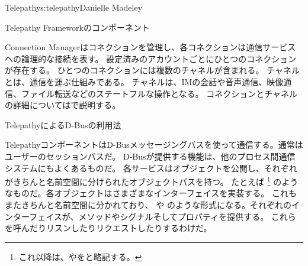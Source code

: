 \begin{aosachapter}{Telepathy}{s:telepathy}{Danielle Madeley}
\begin{aosasect1}{Telepathy Frameworkのコンポーネント}
\begin{aosadescription}
\end{aosadescription}

Connection Managerはコネクションを管理し、各コネクションは通信サービスへの論理的な接続を表す。
設定済みのアカウントごとにひとつのコネクションが存在する。
ひとつのコネクションには複数のチャネルが含まれる。
チャネルとは、通信を運ぶ仕組みである。
チャネルは、IMの会話や音声通信、映像通信、ファイル転送などのステートフルな操作となる。
コネクションとチャネルの詳細についてはで説明する。

\end{aosasect1}

\begin{aosasect1}{TelepathyによるD-Busの利用法}

TelepathyコンポーネントはD-Busメッセージングバスを使って通信する。通常はユーザーのセッションバスだ。
D-Busが提供する機能は、他のプロセス間通信システムにもよくあるものだ。
各サービスはオブジェクトを公開し、それぞれがきちんと名前空間に分けられたオブジェクトパスを持つ。
たとえば
\footnote{これ以降は、やをと略記する。}
のようなものだ。各オブジェクトはさまざまなインターフェイスを実装する。
これもまたきちんと名前空間に分かれており、
や
のような形式になる。それぞれのインターフェイスが、メソッドやシグナルそしてプロパティを提供する。
これらを呼んだりリスンしたりリクエストしたりするわけだ。


\end{aosasect1}
\end{aosachapter}
